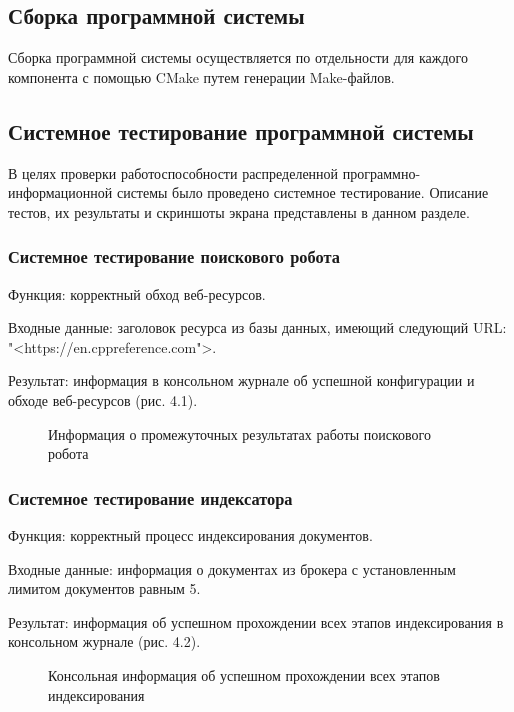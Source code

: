 \subsection{Сборка программной системы}

Сборка программной системы осуществляется по отдельности для каждого компонента с помощью CMake путем генерации Make-файлов.

\subsection{Системное тестирование программной системы}

В целях проверки работоспособности распределенной программно-информационной системы было проведено системное тестирование. Описание тестов, их результаты и скриншоты экрана представлены в данном разделе.

\subsubsection{Системное тестирование поискового робота}

Функция: корректный обход веб-ресурсов.

Входные данные: заголовок ресурса из базы данных, имеющий следующий URL: "<https://en.cppreference.com">.

Результат: информация в консольном журнале об успешной конфигурации и обходе веб-ресурсов (рис. 4.1).

\begin{figure}[H]
\caption{Информация о промежуточных результатах работы поискового робота}
\label{tests/robot.png:image}
\end{figure}

\subsubsection{Системное тестирование индексатора}
Функция: корректный процесс индексирования документов.

Входные данные: информация о документах из брокера с установленным лимитом документов равным 5. 

Результат: информация об успешном прохождении всех этапов индексирования в консольном журнале (рис. 4.2).

\begin{figure}[H]
\caption{Консольная информация об успешном прохождении всех этапов индексирования}
\label{tests/indexer.png:image}
\end{figure}

